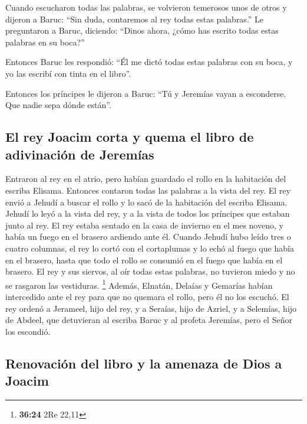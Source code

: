 \begin{paracol}{2}
 Cuando escucharon todas las palabras, se volvieron
temerosos unos de otros y dijeron a Baruc: ``Sin duda, contaremos al rey
todas estas palabras.''  Le preguntaron a Baruc,
diciendo: ``Dinos ahora, ¿cómo has escrito todas estas palabras en su
boca?''

 Entonces Baruc les respondió: ``Él me dictó todas estas
palabras con su boca, y yo las escribí con tinta en el libro''.

 Entonces los príncipes le dijeron a Baruc: ``Tú y
Jeremías vayan a esconderse. Que nadie sepa dónde están''.

\hypertarget{el-rey-joacim-corta-y-quema-el-libro-de-adivinaciuxf3n-de-jeremuxedas}{%
\subsection{El rey Joacim corta y quema el libro de adivinación de
Jeremías}\label{el-rey-joacim-corta-y-quema-el-libro-de-adivinaciuxf3n-de-jeremuxedas}}

 Entraron al rey en el atrio, pero habían guardado el
rollo en la habitación del escriba Elisama. Entonces contaron todas las
palabras a la vista del rey.  El rey envió a Jehudí a
buscar el rollo y lo sacó de la habitación del escriba Elisama. Jehudí
lo leyó a la vista del rey, y a la vista de todos los príncipes que
estaban junto al rey.  El rey estaba sentado en la casa
de invierno en el mes noveno, y había un fuego en el brasero ardiendo
ante él.  Cuando Jehudí hubo leído tres o cuatro
columnas, el rey lo cortó con el cortaplumas y lo echó al fuego que
había en el brasero, hasta que todo el rollo se consumió en el fuego que
había en el brasero.  El rey y sus siervos, al oír todas
estas palabras, no tuvieron miedo y no se rasgaron las vestiduras.
\footnote{\textbf{36:24} 2Re 22,11}  Además, Elnatán,
Delaías y Gemarías habían intercedido ante el rey para que no quemara el
rollo, pero él no los escuchó.  El rey ordenó a Jerameel,
hijo del rey, y a Seraías, hijo de Azriel, y a Selemías, hijo de Abdeel,
que detuvieran al escriba Baruc y al profeta Jeremías, pero el Señor los
escondió.

\hypertarget{renovaciuxf3n-del-libro-y-la-amenaza-de-dios-a-joacim}{%
\subsection{Renovación del libro y la amenaza de Dios a
Joacim}\label{renovaciuxf3n-del-libro-y-la-amenaza-de-dios-a-joacim}}


\end{paracol}
